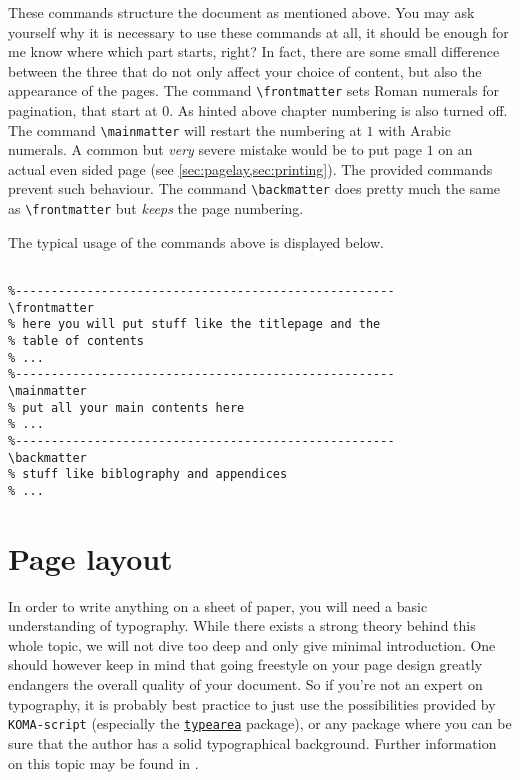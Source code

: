 These commands structure the document as mentioned above. You may ask yourself why it is 
necessary to use these commands at all, it should be enough for me know where which part 
starts, right? In fact, there are some small difference between the three that do not 
only affect your choice of content, but also the appearance of the pages. The command 
\lstinline|\frontmatter| sets Roman numerals for pagination, that start at $0$. As hinted 
above chapter numbering is also turned off.
The command \lstinline|\mainmatter| will restart the numbering at $1$ with Arabic numerals. 
A common but \emph{very} severe mistake would be to put page $1$ on an actual even sided page 
(see \cref{sec:pagelay,sec:printing}). The provided commands prevent such behaviour.
The command \lstinline|\backmatter| does pretty much the same as \lstinline|\frontmatter| 
but \emph{keeps} the page numbering.
\begin{example}{}{}
The typical usage of the commands above is displayed below.
\begin{lstlisting}

%-----------------------------------------------------
\frontmatter
% here you will put stuff like the titlepage and the 
% table of contents
% ...
%-----------------------------------------------------
\mainmatter
% put all your main contents here
% ...
%-----------------------------------------------------
\backmatter
% stuff like biblography and appendices 
% ...

\end{lstlisting}	
\end{example}
\section{Page layout}\label{sec:pagelay}
In order to write anything on a sheet of paper, you will need a basic understanding 
of typography. While there exists a strong theory behind this whole topic, we will 
not dive too deep and only give minimal introduction. One should however keep in mind that 
going freestyle on your page design greatly endangers the overall quality of your document. 
So if you're not an expert on typography, it is probably best practice to just use the 
possibilities provided by \texttt{KOMA-script} 
(especially the \href{https://ctan.org/pkg/enumitem}{\texttt{typearea}} package), 
or any package where you can be sure that 
the author has a solid typographical background. Further information on this topic may be 
found in \cite{Tschichold75, Willberg99}.
